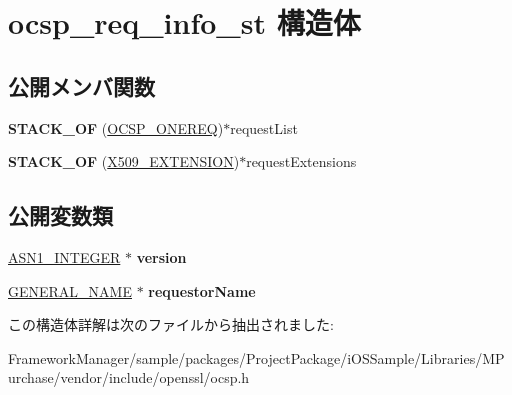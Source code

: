 \hypertarget{structocsp__req__info__st}{}\section{ocsp\+\_\+req\+\_\+info\+\_\+st 構造体}
\label{structocsp__req__info__st}
\subsection*{公開メンバ関数}
\begin{DoxyCompactItemize}
\item 
\hypertarget{structocsp__req__info__st_ad3f99369c4dc287eff1f44a8754f9826}{}{\bfseries S\+T\+A\+C\+K\+\_\+\+O\+F} (\hyperlink{structocsp__one__request__st}{O\+C\+S\+P\+\_\+\+O\+N\+E\+R\+E\+Q})$\ast$request\+List\label{structocsp__req__info__st_ad3f99369c4dc287eff1f44a8754f9826}

\item 
\hypertarget{structocsp__req__info__st_a2941bbf871be57d2720eda2a5ef440e0}{}{\bfseries S\+T\+A\+C\+K\+\_\+\+O\+F} (\hyperlink{struct_x509__extension__st}{X509\+\_\+\+E\+X\+T\+E\+N\+S\+I\+O\+N})$\ast$request\+Extensions\label{structocsp__req__info__st_a2941bbf871be57d2720eda2a5ef440e0}

\end{DoxyCompactItemize}
\subsection*{公開変数類}
\begin{DoxyCompactItemize}
\item 
\hypertarget{structocsp__req__info__st_a945a047ebca6883967b717d6d39a5411}{}\hyperlink{structasn1__string__st}{A\+S\+N1\+\_\+\+I\+N\+T\+E\+G\+E\+R} $\ast$ {\bfseries version}\label{structocsp__req__info__st_a945a047ebca6883967b717d6d39a5411}

\item 
\hypertarget{structocsp__req__info__st_a6fd6c3850e1765a3e9a78b89c6d32f22}{}\hyperlink{struct_g_e_n_e_r_a_l___n_a_m_e__st}{G\+E\+N\+E\+R\+A\+L\+\_\+\+N\+A\+M\+E} $\ast$ {\bfseries requestor\+Name}\label{structocsp__req__info__st_a6fd6c3850e1765a3e9a78b89c6d32f22}

\end{DoxyCompactItemize}


この構造体詳解は次のファイルから抽出されました\+:\begin{DoxyCompactItemize}
\item 
Framework\+Manager/sample/packages/\+Project\+Package/i\+O\+S\+Sample/\+Libraries/\+M\+Purchase/vendor/include/openssl/ocsp.\+h\end{DoxyCompactItemize}
